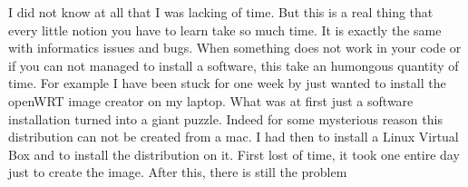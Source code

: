\par 
I did not know at all that I was lacking of time. But this is a real thing that every little notion you have to learn take so much time. It is exactly the same with informatics issues and bugs. When something does not work in your code or if you can not managed to install a software, this take an humongous quantity of time. For example I have been stuck for one week by just wanted to install the openWRT image creator on my laptop. What was at first just a software installation turned into a giant puzzle. Indeed for some mysterious reason this distribution can not be created from a mac. I had then to install a Linux Virtual Box and to install the distribution on it. First lost of time, it took one entire day just to create the image. After this, there is still the problem